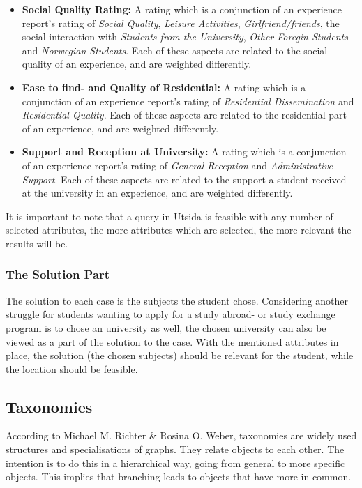 \begin{itemize}
\item \textbf{Social Quality Rating:} A rating which is a conjunction of an experience report's rating of  \emph{Social Quality}, \emph{Leisure Activities}, \emph{Girlfriend/friends}, the social interaction with \emph{Students from the University}, \emph{Other Foregin Students} and \emph{Norwegian Students}. Each of these aspects are related to the social quality of an experience, and are weighted differently.

\item \textbf{Ease to find- and Quality of Residential:} A rating which is a conjunction of an experience report's rating of \emph{Residential Dissemination} and \emph{Residential Quality}. Each of these aspects are related to the residential part of an experience, and are weighted differently.

\item \textbf{Support and Reception at University:} A rating which is a conjunction of an experience report's rating of \emph{General Reception} and \emph{Administrative Support}. Each of these aspects are related to the support a student received at the university in an experience, and are weighted differently.
\end{itemize}

It is important to note that a query in Utsida is feasible with any number of selected attributes, the more attributes which are selected, the more relevant the results will be. 


\subsubsection{The Solution Part}
The solution to each case is the subjects the student chose. Considering another struggle for students wanting to apply for a study abroad- or study exchange program is to chose an university as well, the chosen university can also be viewed as a part of the solution to the case. With the mentioned attributes in place, the solution (the chosen subjects) should be relevant for the student, while the location should be feasible. 

\subsection{Taxonomies}\label{sec:taxonomies}
According to Michael M. Richter \& Rosina O. Weber\cite{richter2013case}, taxonomies are widely used structures and specialisations of graphs. They relate
objects to each other. The intention is to do this in a hierarchical way, going from
general to more specific objects. This implies that branching leads to objects that
have more in common. 

